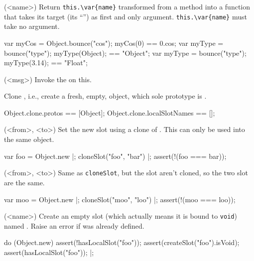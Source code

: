 \begin{urbiscriptapi}
\item[bounce](<name>)%
  Return \lstinline|this.\var{name}| transformed from a method into a
  function that takes its target (its ``\this'') as first
  and only argument.  \lstinline|this.\var{name}| must take no
  argument.
\begin{urbiassert}
{ var myCos = Object.bounce("cos"); myCos(0) }    == 0.cos;
{ var myType = bounce("type"); myType(Object); } == "Object";
{ var myType = bounce("type"); myType(3.14); }   == "Float";
\end{urbiassert}

\item[callMessage](<msg>)%
  Invoke the   on this.
\item[clone]
  Clone \this, i.e., create a fresh, empty, object, which
  sole prototype is \this.
\begin{urbiassert}
Object.clone.protos == [Object];
Object.clone.localSlotNames == [];
\end{urbiassert}

\item[cloneSlot](<from>, <to>)%
  Set the new slot  using a clone of . This can only
  be used into the same object.

\begin{urbiscript}
var foo = Object.new |;
cloneSlot("foo", "bar") |;
assert(!(foo === bar));
\end{urbiscript}

\item[copySlot](<from>, <to>)%
  Same as \lstinline|cloneSlot|, but the slot aren't cloned, so the
  two slot are the same.
\begin{urbiscript}
var moo = Object.new |;
cloneSlot("moo", "loo") |;
assert(!(moo === loo));
\end{urbiscript}

\item[createSlot](<name>)%
  Create an empty slot (which actually means it is bound to
  \lstinline|void|) named .  Raise an error if 
  was already defined.
\begin{urbiscript}
do (Object.new)
{
  assert(!hasLocalSlot("foo"));
  assert(createSlot("foo").isVoid);
  assert(hasLocalSlot("foo"));
}|;
\end{urbiscript}


\end{urbiscriptapi}
